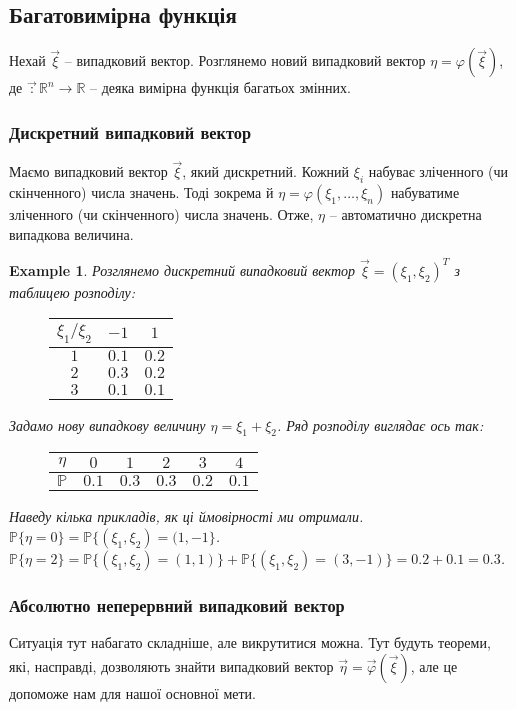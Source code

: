 \documentclass[a4paper, 10pt]{article}
\theoremstyle{theoremdd}
\newtheorem{example}[theorem]{Example}
\begin{document}
\subsection{Багатовимірна функція}
Нехай $\vec{\xi}$ -- випадковий вектор. Розглянемо новий випадковий вектор $\eta = \varphi(\vec{\xi})$, де $\vec \colon \mathbb{R}^n \to \mathbb{R}$ -- деяка вимірна функція багатьох змінних.

\subsubsection{Дискретний випадковий вектор}
Маємо випадковий вектор $\vec{\xi}$, який дискретний. Кожний $\xi_i$ набуває зліченного (чи скінченного) числа значень. Тоді зокрема й $\eta = \varphi(\xi_1,\dots,\xi_n)$ набуватиме зліченного (чи скінченного) числа значень. Отже, $\eta$ -- автоматично дискретна випадкова величина.

\begin{example}
Розглянемо дискретний випадковий вектор $\vec{\xi} = (\xi_1,\xi_2)^T$ з таблицею розподілу:
\begin{figure}[H]
\centering
\begin{tabular}{c|c|c}
 $\xi_1/ \xi_2$ & $-1$ & $1$ \\
 \hline
 $1$ & $0.1$ & $0.2$ \\ 
 \hline
  $2$ & $0.3$ & $0.2$ \\
  \hline
  $3$ & $0.1$ & $0.1$
\end{tabular}
\end{figure}
\noindent
Задамо нову випадкову величину $\eta = \xi_1 + \xi_2$. Ряд розподілу виглядає ось так:
\begin{figure}[H]
\centering
\begin{tabular}{c|c|c|c|c|c}
$\eta$ & $0$ & $1$ & $2$ & $3$ & $4$ \\
\hline
$\mathbb{P}$ & $0.1$ & $0.3$ & $0.3$ & $0.2$ & $0.1$
\end{tabular}
\end{figure}
\noindent
Наведу кілька прикладів, як ці ймовірності ми отримали.\\
$\mathbb{P}\{\eta = 0\} = \mathbb{P}\{(\xi_1,\xi_2) = (1,-1\}$.\\
$\mathbb{P}\{\eta = 2\} = \mathbb{P}\{(\xi_1,\xi_2) = (1,1)\} + \mathbb{P}\{(\xi_1,\xi_2) = (3,-1)\} = 0.2 + 0.1 = 0.3$.
\end{example}

\subsubsection{Абсолютно неперервний випадковий вектор}
\noindent
Ситуація тут набагато складніше, але викрутитися можна. Тут будуть теореми, які, насправді, дозволяють знайти випадковий вектор $\vec{\eta} = \vec{\varphi}(\vec{\xi})$, але це допоможе нам для нашої основної мети.
\end{document}
